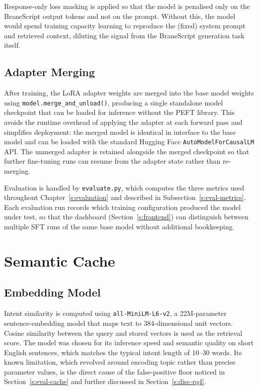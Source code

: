 Response-only loss masking is applied so that the model is penalised only on
the BraneScript output tokens and not on the prompt. Without this, the model
would spend training capacity learning to reproduce the (fixed) system prompt
and retrieved context, diluting the signal from the BraneScript generation
task itself.

\subsection{Adapter Merging}

After training, the LoRA adapter weights are merged into the base model
weights using \texttt{model.merge\_and\_unload()}, producing a single
standalone model checkpoint that can be loaded for inference without the PEFT
library. This avoids the runtime overhead of applying the adapter at each
forward pass and simplifies deployment: the merged model is identical in
interface to the base model and can be loaded with the standard Hugging Face
\texttt{AutoModelForCausalLM} API. The unmerged adapter is retained alongside
the merged checkpoint so that further fine-tuning runs can resume from the
adapter state rather than re-merging.

Evaluation is handled by \texttt{evaluate.py}, which computes the three
metrics used throughout Chapter~\ref{s:evaluation} and described in Subsection~\ref{s:eval-metrics}.
Each evaluation run records which training
configuration produced the model under test, so that the dashboard
(Section~\ref{s:frontend}) can distinguish between multiple SFT runs of
the same base model without additional bookkeeping.

\section{Semantic Cache}\label{s:cache-impl}

\subsection{Embedding Model}

Intent similarity is computed using \texttt{all-MiniLM-L6-v2}, a 22M-parameter
sentence-embedding model that maps text to 384-dimensional unit vectors.
Cosine similarity between the query and stored vectors is used as the
retrieval score. The model was chosen for its inference speed and semantic
quality on short English sentences, which matches the typical intent length
of 10--30 words. Its known limitation, which revolved around encoding
topic rather than precise parameter values, is the direct cause of the 
false-positive floor noticed in Section~\ref{s:eval-cache} and further discussed in Section~\ref{s:disc-rq4}.

